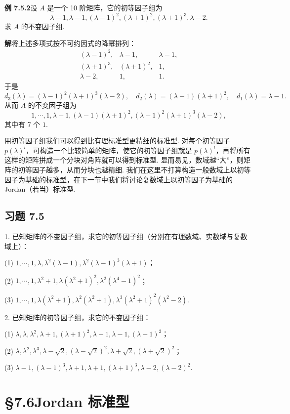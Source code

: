 \documentclass[UTF8, 12pt, fontset=fandol, oneside]{ctexart}
\begin{document}
\noindent\textbf{例 7.5.2}\quad 设 $A$ 是一个 10 阶矩阵，它的初等因子组为
\[
\lambda-1,\lambda-1,(\lambda-1)^2,(\lambda+1)^2,(\lambda+1)^3,\lambda-2.
\]
求 $A$ 的不变因子组.

\noindent\textbf{解}\quad 将上述多项式按不可约因式的降幂排列：
\[
\begin{array}{ccc}
(\lambda-1)^2, & \lambda-1, & \lambda-1,\\
(\lambda+1)^3, & (\lambda+1)^2, & 1,\\
\lambda-2, & 1, & 1.
\end{array}
\]
于是
\[
d_3(\lambda)=(\lambda-1)^2(\lambda+1)^3(\lambda-2),\quad
d_2(\lambda)=(\lambda-1)(\lambda+1)^2,\quad
d_1(\lambda)=\lambda-1.
\]
从而 $A$ 的不变因子组为
\[
1,\cdots,1,\lambda-1,(\lambda-1)(\lambda+1)^2,(\lambda-1)^2(\lambda+1)^3(\lambda-2),
\]
其中有 7 个 $1$.

用初等因子组我们可以得到比有理标准型更精细的标准型. 对每个初等因子 $p(\lambda)^l$，可构造一个比较简单的矩阵，使它的初等因子组就是 $p(\lambda)^l$，再将所有这样的矩阵拼成一个分块对角阵就可以得到标准型. 显而易见，数域越“大”，则矩阵的初等因子越多，从而分块也越精细. 我们在这里不打算构造一般数域上以初等因子为基础的标准型，在下一节中我们将讨论复数域上以初等因子为基础的 Jordan（若当）标准型.

\subsection*{习题 7.5}

1. 已知矩阵的不变因子组，求它的初等因子组（分别在有理数域、实数域与复数域上）：

(1) $1,\cdots,1,\lambda,\lambda^2(\lambda-1),\lambda^2(\lambda-1)^3(\lambda+1)$；

(2) $1,\cdots,1,\lambda^2+1,\lambda(\lambda^2+1)^2,\lambda^2(\lambda^4-1)^2$；

(3) $1,\cdots,1,\lambda(\lambda^2+1),\lambda^2(\lambda^2+1),\lambda^3(\lambda^2+1)^2(\lambda^2-2)$.

2. 已知矩阵的初等因子组，求它的不变因子组：

(1) $\lambda,\lambda,\lambda^2,\lambda+1,(\lambda+1)^2,\lambda-1,\lambda-1,(\lambda-1)^2$；

(2) $\lambda,\lambda^2,\lambda^3,\lambda-\sqrt{2},(\lambda-\sqrt{2})^2,\lambda+\sqrt{2},(\lambda+\sqrt{2})^2$；

(3) $\lambda-1,(\lambda-1)^3,\lambda+1,\lambda+1,(\lambda+1)^3,\lambda-2,(\lambda-2)^2$.

\section*{§7.6\quad Jordan 标准型}
\end{document}
